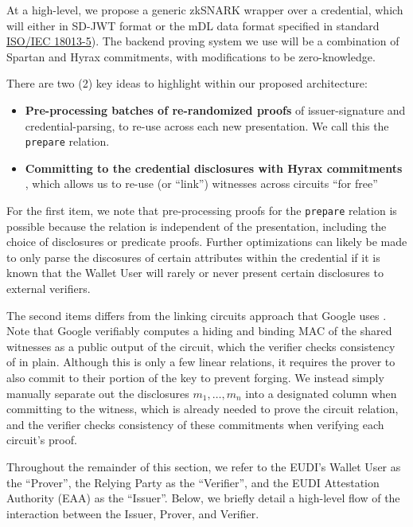At a high-level, we propose a generic zkSNARK wrapper over a credential, which will either in SD-JWT format or the mDL data format specified in standard \href{https://mobiledl-e5018.web.app/ISO_18013-5_E_draft.pdf}{ISO/IEC 18013-5}). The backend proving system we use will be a combination of Spartan and Hyrax commitments, with modifications to be zero-knowledge. 

There are two (2) key ideas to highlight within our proposed architecture:

\begin{itemize}
    \item \textbf{Pre-processing batches of re-randomized proofs} of issuer-signature and credential-parsing, to re-use across each new presentation. We call this the \texttt{prepare} relation.
    \item \textbf{Committing to the credential disclosures with Hyrax commitments} \cite{cryptoeprint:2017/1132}, which allows us to re-use (or ``link'') witnesses across circuits ``for free''
\end{itemize}

For the first item, we note that pre-processing proofs for the \texttt{prepare} relation is possible because the relation is independent of the presentation, including the choice of disclosures or predicate proofs. Further optimizations can likely be made to only parse the discosures of certain attributes within the credential if it is known that the Wallet User will rarely or never present certain disclosures to external verifiers.

The second items differs from the linking circuits approach that Google uses \cite{cryptoeprint:2024/2010}. Note that Google verifiably computes a hiding and binding MAC of the shared witnesses as a public output of the circuit, which the verifier checks consistency of in plain. Although this is only a few linear relations, it requires the prover to also commit to their portion of the key to prevent forging. We instead simply manually separate out the disclosures $m_1, \dots, m_n$ into a designated column when committing to the witness, which is already needed to prove the circuit relation, and the verifier checks consistency of these commitments when verifying each circuit's proof.

Throughout the remainder of this section, we refer to the EUDI's Wallet User as the ``Prover'', the Relying Party as the ``Verifier'', and the EUDI Attestation Authority (EAA) as the ``Issuer''. Below, we briefly detail a high-level flow of the interaction between the Issuer, Prover, and Verifier.

